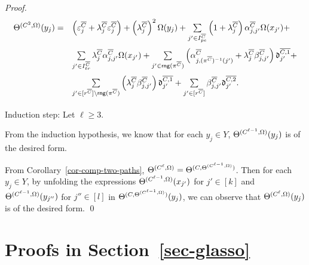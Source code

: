 \begin{appendix}
\begin{proof}
\[
\begin{array}{rl}
	\medskip
	\sumf^{(C^{2},\initval)}(y_j) = & 
	\left(\cste^{\circled{C}}_{j}+
	\cstl^{\circled{C}}_{j} \cste^{\circled{C}}_{j}\right)+ \left(\cstl^{\circled{C}}_{j}\right)^2 \initval(y_j)+ \sum \limits_{j' \in I^{\circled{C}}_{pe}} 
	\left(1+\cstl^{\circled{C}}_{j}\right)  \csta^{\circled{C}}_{j,j'} \initval(x_{j'}) +\\
	\medskip
	& 
	\sum \limits_{j' \in  I^{\circled{C}}_{tr}} 
	 \cstl^{\circled{C}}_{j} \csta^{\circled{C}}_{j,j'}  \initval(x_{j'}) +
	\sum \limits_{j' \in \rng(\pi^{\circled{C}})} \left( \csta^{\circled{C}}_{j,(\pi^{\circled{C}})^{-1}(j')}+\cstl^{\circled{C}}_{j} \cstb^{\circled{C}}_{j,j'} \right) \vard^{\circled{C,1}}_{j'} + 
	 \\
	\smallskip
	& 
	\sum \limits_{j' \in [r^{\circled{C}}]\setminus \rng(\pi^{\circled{C}})} \left( \cstl^{\circled{C}}_{j} \cstb^{\circled{C}}_{j,j'} \right) \vard^{\circled{C,1}}_{j'} +
	
	\sum \limits_{j'\in[r^{\circled{C}}]} \cstb^{\circled{C}}_{j,j'} \vard^{\circled{C,2}}_{j'}.
\end{array}
\]

\noindent Induction step: Let $\ell \ge 3$.

From the induction hypothesis, we know that for each $y_j \in Y$, $\Theta^{(C^{\ell-1},\Omega)}(y_j)$ is of the desired form.

From Corollary~\ref{cor-comp-two-paths}, $\Theta^{(C^\ell,\Omega)} = \Theta^{(C, \Theta^{(C^{\ell-1},\Omega)})}$. Then for each $y_j \in Y$, by unfolding the expressions $\Theta^{(C^{\ell-1},\Omega)}(x_{j'})$ for $j' \in [k]$ and $\Theta^{(C^{\ell-1},\Omega)}(y_{j''})$ for $j'' \in [l]$ in $\Theta^{(C, \Theta^{(C^{\ell-1},\Omega)})}(y_j)$, we can observe that $\Theta^{(C^\ell,\Omega)}(y_j)$ is of the desired form.
\qed
\end{proof}

\section{Proofs in Section~\ref{sec-glasso}}




\end{appendix}
